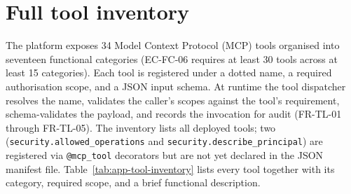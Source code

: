 \documentclass[a4paper]{sapthesis}
\begin{document}
\section{Full tool inventory}
\label{app:tool-inventory}

The platform exposes 34 Model Context Protocol (MCP) tools organised
into seventeen functional categories (EC-FC-06 requires at least 30
tools across at least 15 categories).  Each tool is registered under a
dotted name, a required authorisation scope, and a JSON input schema.
At runtime the tool dispatcher resolves the name, validates the
caller's scopes against the tool's requirement, schema-validates the
payload, and records the invocation for audit (FR-TL-01 through
FR-TL-05).  The inventory lists all deployed tools; two
(\texttt{security.allowed\_operations} and
\texttt{security.describe\_principal}) are registered via
\texttt{@mcp\_tool} decorators but are not yet declared in the JSON
manifest file.  Table~\ref{tab:app-tool-inventory} lists every tool
together with its category, required scope, and a brief functional
description.
\end{document}
